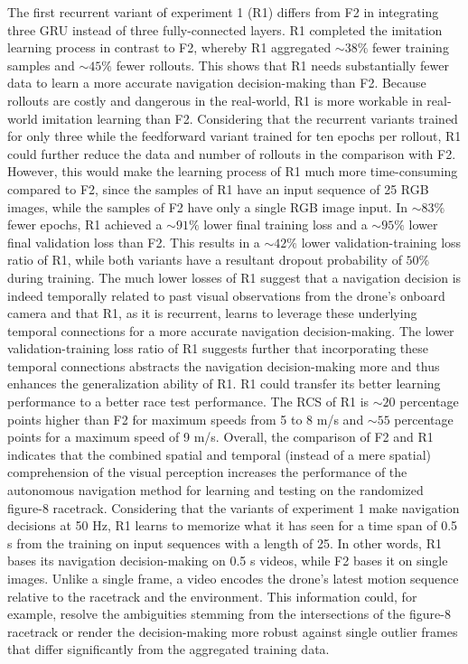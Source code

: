 The first recurrent variant of experiment 1 (R1) differs 
from F2 in integrating three GRU instead of three fully-connected layers. 
R1 completed the imitation learning process in contrast to F2, 
whereby R1 aggregated $\sim 38\%$ fewer training samples and $\sim 45\%$ fewer rollouts. 
This shows that R1 needs substantially fewer data to learn a more accurate 
navigation decision-making than F2. Because rollouts are costly and dangerous in the 
real-world, R1 is more workable in real-world imitation learning than F2. Considering 
that the recurrent variants trained for only three while the feedforward variant trained 
for ten epochs per rollout, R1 could further reduce the data and number of rollouts in 
the comparison with F2. However, this would make the learning process of R1 much more 
time-consuming compared to F2, since the samples of R1 have an input sequence of 25 RGB 
images, while the samples of F2 have only a single RGB image input. 
In $\sim 83\%$ fewer epochs, R1 achieved a $\sim 91\%$ lower final training loss 
and a $\sim 95\%$ lower 
final validation loss than F2. This results in a $\sim 42\%$ lower validation-training loss 
ratio of R1, while both variants have a resultant dropout probability of 
$50\%$ during training. 
The much lower losses of R1 suggest that a navigation decision is indeed temporally 
related to past visual observations from the drone's onboard camera and that R1, 
as it is recurrent, learns to leverage these underlying temporal connections for a more 
accurate navigation decision-making. The lower validation-training loss ratio of R1 suggests 
further that incorporating these temporal connections abstracts the navigation 
decision-making more and thus enhances the generalization ability of R1. R1 could 
transfer its better learning performance to a better race test performance. The RCS of 
R1 is $\sim 20$ percentage points higher than F2 for maximum speeds from 5 to 8 m/s and $\sim 55$ 
percentage points for a maximum speed of 9 m/s. Overall, the comparison of F2 and R1 
indicates that the combined spatial and temporal (instead of a mere spatial) comprehension 
of the visual perception increases the performance of the autonomous navigation method for 
learning and testing on the randomized figure-8 racetrack. Considering that the variants of 
experiment 1 make navigation decisions at 50 Hz, R1 learns to memorize what it has seen for 
a time span of 0.5 s from the training on input sequences with a length of 25. In other words, 
R1 bases its navigation decision-making on 0.5 s videos, while F2 bases it on single images. 
Unlike a single frame, a video encodes the drone's latest motion sequence relative to the 
racetrack and the environment. This information could, for example, resolve the ambiguities 
stemming from the intersections of the figure-8 racetrack or render the decision-making more 
robust against single outlier frames that differ significantly from the aggregated training data.



